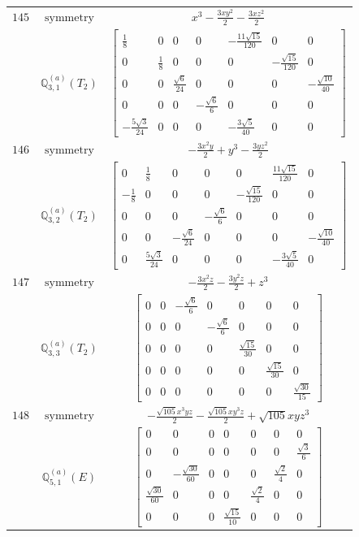 \documentclass[fleqn,8pt,landscape]{jsarticle}
\begin{document}
\begin{longtable}{ccc}
$ 145 $ & $ \text{symmetry} $ & $ x^{3} - \frac{3 x y^{2}}{2} - \frac{3 x z^{2}}{2} $ \\
$  $ & $ \mathbb{Q}_{3,1}^{(a)}(T_{2}) $ & $ \begin{bmatrix} \frac{1}{8} & 0 & 0 & 0 & - \frac{11 \sqrt{15}}{120} & 0 & 0 \\ 0 & \frac{1}{8} & 0 & 0 & 0 & - \frac{\sqrt{15}}{120} & 0 \\ 0 & 0 & \frac{\sqrt{6}}{24} & 0 & 0 & 0 & - \frac{\sqrt{10}}{40} \\ 0 & 0 & 0 & - \frac{\sqrt{6}}{6} & 0 & 0 & 0 \\ - \frac{5 \sqrt{3}}{24} & 0 & 0 & 0 & - \frac{3 \sqrt{5}}{40} & 0 & 0 \end{bmatrix} $ \\ \hline
$ 146 $ & $ \text{symmetry} $ & $ - \frac{3 x^{2} y}{2} + y^{3} - \frac{3 y z^{2}}{2} $ \\
$  $ & $ \mathbb{Q}_{3,2}^{(a)}(T_{2}) $ & $ \begin{bmatrix} 0 & \frac{1}{8} & 0 & 0 & 0 & \frac{11 \sqrt{15}}{120} & 0 \\ - \frac{1}{8} & 0 & 0 & 0 & - \frac{\sqrt{15}}{120} & 0 & 0 \\ 0 & 0 & 0 & - \frac{\sqrt{6}}{6} & 0 & 0 & 0 \\ 0 & 0 & - \frac{\sqrt{6}}{24} & 0 & 0 & 0 & - \frac{\sqrt{10}}{40} \\ 0 & \frac{5 \sqrt{3}}{24} & 0 & 0 & 0 & - \frac{3 \sqrt{5}}{40} & 0 \end{bmatrix} $ \\ \hline
$ 147 $ & $ \text{symmetry} $ & $ - \frac{3 x^{2} z}{2} - \frac{3 y^{2} z}{2} + z^{3} $ \\
$  $ & $ \mathbb{Q}_{3,3}^{(a)}(T_{2}) $ & $ \begin{bmatrix} 0 & 0 & - \frac{\sqrt{6}}{6} & 0 & 0 & 0 & 0 \\ 0 & 0 & 0 & - \frac{\sqrt{6}}{6} & 0 & 0 & 0 \\ 0 & 0 & 0 & 0 & \frac{\sqrt{15}}{30} & 0 & 0 \\ 0 & 0 & 0 & 0 & 0 & \frac{\sqrt{15}}{30} & 0 \\ 0 & 0 & 0 & 0 & 0 & 0 & \frac{\sqrt{30}}{15} \end{bmatrix} $ \\ \hline
$ 148 $ & $ \text{symmetry} $ & $ - \frac{\sqrt{105} x^{3} y z}{2} - \frac{\sqrt{105} x y^{3} z}{2} + \sqrt{105} x y z^{3} $ \\
$  $ & $ \mathbb{Q}_{5,1}^{(a)}(E) $ & $ \begin{bmatrix} 0 & 0 & 0 & 0 & 0 & 0 & 0 \\ 0 & 0 & 0 & 0 & 0 & 0 & \frac{\sqrt{3}}{6} \\ 0 & - \frac{\sqrt{30}}{60} & 0 & 0 & 0 & \frac{\sqrt{2}}{4} & 0 \\ \frac{\sqrt{30}}{60} & 0 & 0 & 0 & \frac{\sqrt{2}}{4} & 0 & 0 \\ 0 & 0 & 0 & \frac{\sqrt{15}}{10} & 0 & 0 & 0 \end{bmatrix} $ \\ \hline

\end{longtable}
\end{document}
